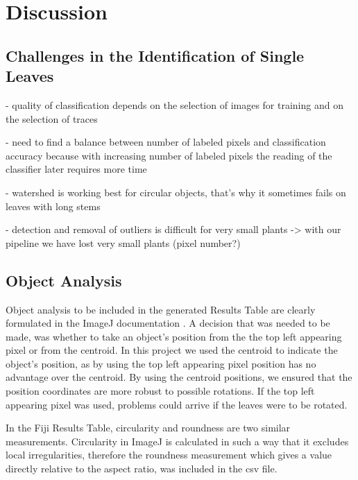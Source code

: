 \documentclass[paper=A4,bibliography=totocnumbered]{scrartcl}
\begin{document}
\section{Discussion}


\subsection{Challenges in the Identification of Single Leaves}
- quality of classification depends on the selection of images for training and on the selection of traces

- need to find a balance between number of labeled pixels and classification accuracy because with increasing number of labeled pixels the reading of the classifier later requires more time

- watershed is working best for circular objects, that's why it sometimes fails on leaves with long stems

- detection and removal of outliers is difficult for very small plants -> with our pipeline we have lost very small plants (pixel number?)

\subsection{Object Analysis}
Object analysis to be included in the generated Results Table are clearly formulated in the ImageJ documentation \citep{Ferreira.2012}. A decision that was needed to be made, was whether to take an object's position from the the top left appearing pixel or from the centroid. In this project we used the centroid to indicate the object's position, as by using the top left appearing pixel position has no advantage over the centroid. By using the centroid positions, we ensured that the position coordinates are more robust to possible rotations. If the top left appearing pixel was used, problems could arrive if the leaves were to be rotated. 

In  the Fiji Results Table, circularity and roundness are two similar measurements. Circularity in ImageJ is calculated in such a way that it excludes local irregularities, therefore the roundness measurement which gives a value directly relative to the aspect ratio, was included in the csv file. 
\end{document}
